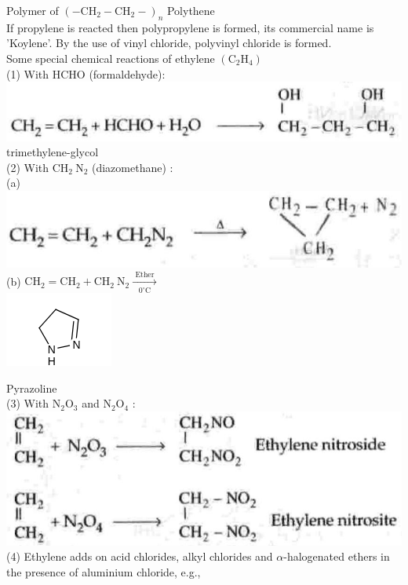 \documentclass[10pt]{article}
\begin{document}
Polymer of $\left(-\mathrm{CH}_{2}-\mathrm{CH}_{2}-\right)_{n}$ Polythene\\
If propylene is reacted then polypropylene is formed, its commercial name is 'Koylene'. By the use of vinyl chloride, polyvinyl chloride is formed.\\
Some special chemical reactions of ethylene $\left(\mathrm{C}_{2} \mathrm{H}_{4}\right)$\\
(1) With HCHO (formaldehyde):\\
\includegraphics[max width=\textwidth, center]{2025_01_28_8470952b98110cec3aabg-185(1)}\\
trimethylene-glycol\\
(2) With $\mathrm{CH}_{2} \mathrm{~N}_{2}$ (diazomethane) :\\
(a)\\
\includegraphics[max width=\textwidth, center]{2025_01_28_8470952b98110cec3aabg-185(3)}\\
(b) $\mathrm{CH}_{2}=\mathrm{CH}_{2}+\mathrm{CH}_{2} \mathrm{~N}_{2} \xrightarrow[0^{\circ} \mathrm{C}]{\text { Ether }}$\\
\includegraphics{smile-8eeae161fae7359cbc209978aede95a1a41f349d}

Pyrazoline\\
(3) With $\mathrm{N}_{2} \mathrm{O}_{3}$ and $\mathrm{N}_{2} \mathrm{O}_{4}$ :\\
\includegraphics[max width=\textwidth, center]{2025_01_28_8470952b98110cec3aabg-186(3)}\\
(4) Ethylene adds on acid chlorides, alkyl chlorides and $\alpha$-halogenated ethers in the presence of aluminium chloride, e.g.,
\end{document}
